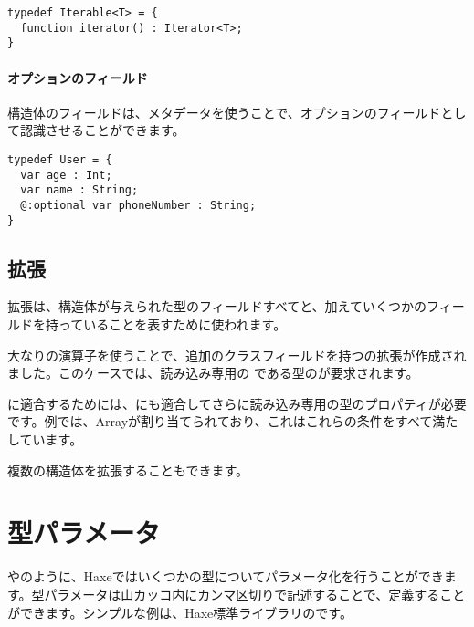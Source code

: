 \begin{lstlisting}
typedef Iterable<T> = {
  function iterator() : Iterator<T>;
}
\end{lstlisting}

\paragraph{オプションのフィールド}

構造体のフィールドは、メタデータを使うことで、オプションのフィールドとして認識させることができます。

\begin{lstlisting}
typedef User = {
  var age : Int;
  var name : String;
  @:optional var phoneNumber : String;
}
\end{lstlisting}

\subsection{拡張}
\label{type-system-extensions}


拡張は、構造体が与えられた型のフィールドすべてと、加えていくつかのフィールドを持っていることを表すために使われます。

大なりの演算子を使うことで、追加のクラスフィールドを持つの拡張が作成されました。このケースでは、読み込み専用の である型のが要求されます。 

に適合するためには、にも適合してさらに読み込み専用の型のプロパティが必要です。例では、Arrayが割り当てられており、これはこれらの条件をすべて満たしています。

複数の構造体を拡張することもできます。


\section{型パラメータ}
\label{type-system-type-parameters}

やのように、Haxeではいくつかの型についてパラメータ化を行うことができます。型パラメータは山カッコ\expr{$<>$}内にカンマ区切りで記述することで、定義することができます。シンプルな例は、Haxe標準ライブラリのです。

